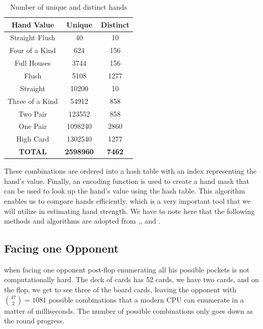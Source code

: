 \begin{table}[h]
    \centering
    \begin{tabular}{|c|c|c|}
        \hline
        \textbf{Hand Value} & \textbf{Unique}  & \textbf{Distinct} \\\hline
        Straight Flush      & 40               & 10                \\\hline
        Four of a Kind      & 624              & 156               \\\hline
        Full Houses         & 3744             & 156               \\\hline
        Flush               & 5108             & 1277              \\\hline
        Straight            & 10200            & 10                \\\hline
        Three of a Kind     & 54912            & 858               \\\hline
        Two Pair            & 123552           & 858               \\\hline
        One Pair            & 1098240          & 2860              \\\hline
        High Card           & 1302540          & 1277              \\\hline
        \textbf{TOTAL}      & \textbf{2598960} & \textbf{7462}     \\\hline
    \end{tabular}
    \caption{Number of unique and distinct hands}
    \label{tab:unique}
\end{table}

These combinations are ordered into a hash table with an index representing the hand's value. Finally, an encoding function is used to create a hand mask that can be used to look up the hand's value using the hash table. This algorithm enables us to compare hands efficiently, which is a very important tool that we will utilize in estimating hand strength. We have to note here that the following methods and algorithms are adopted from \cite{billings_challenge_2002},\cite{papp_dealing_1998}, and \cite{davidson_improved_2000}.


\subsection{Facing one Opponent}
when facing one opponent post-flop enumerating all his possible pockets is not computationally hard. The deck of cards has 52 cards, we have two cards, and on the flop, we get to see three of the board cards, leaving the opponent with ${47 \choose 2} = 1081$ possible combinations that a modern  CPU can enumerate in a matter of milliseconds. The number of possible combinations only goes down as the round progress.

